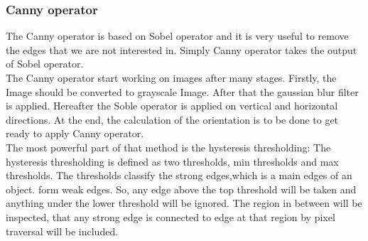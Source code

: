 \documentclass[journal,final,a4paper,twoside]{PS}
\begin{document}
\subsubsection{Canny operator}
The Canny operator is based on Sobel operator and it is very useful to remove the edges that we are not interested in.  Simply Canny operator takes the output of Sobel operator. 
\\
The Canny operator start working on images after many stages. Firstly, the Image should be converted to grayscale Image. After that the gaussian blur filter is applied.   Hereafter the Soble operator is applied on vertical and horizontal directions. At the end, the calculation of the orientation is to be done to get ready to apply Canny operator.
\\
The most powerful part of that method is the hysteresis thresholding: The hysteresis thresholding is defined as two thresholds, min thresholds and max thresholds. The thresholds classify the strong edges,which is a main edges of an object. form weak edges.  So, any edge above the top threshold will be taken and anything under the lower threshold will be ignored. The region in between will be inspected, that any strong edge is connected to edge at that region by pixel traversal will be included.
\end{document}
